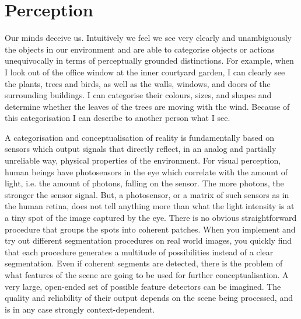 \chapter{Perception} \label{chap:3}
Our minds deceive us. Intuitively we feel we see very clearly and 
unambiguously the objects in our environment and are able 
to categorise objects or actions unequivocally in terms of 
perceptually grounded distinctions. For example, when 
I look out of the office window at the inner 
courtyard garden, I can clearly see the plants, trees
and birds, as well as the walls, windows, and doors of 
the surrounding buildings. I can categorise their 
colours, sizes, and shapes and determine whether the 
leaves of the trees are moving with the wind. Because of 
this categorisation I can describe to another person what 
I see. 

A categorisation and conceptualisation
of reality is fundamentally based on sensors which output 
signals that directly 
reflect, in an analog and partially unreliable way, physical
properties of the environment. For visual perception, 
human beings have photosensors in the eye which correlate 
with the amount of light, i.e. the amount of 
photons, falling on the sensor. The more photons, the stronger
the sensor signal. But, a photosensor, or a matrix of 
such sensors as in the human
retina, does not tell anything more than what the light
intensity is at a tiny spot of the image captured
by the eye. There is no obvious straightforward
procedure that groups the spots 
into coherent patches.
When you implement and try out different segmentation procedures
on real world images, you quickly find that each procedure
generates a multitude of possibilities instead of a clear 
segmentation. Even if
coherent segments are detected, there is the problem of what 
features of the scene are going to be used for further
conceptualisation. A very large, open-ended
set of possible feature detectors can be
imagined. The quality and reliability of their
output depends on the scene being processed, and is in any 
case strongly context-dependent. 

